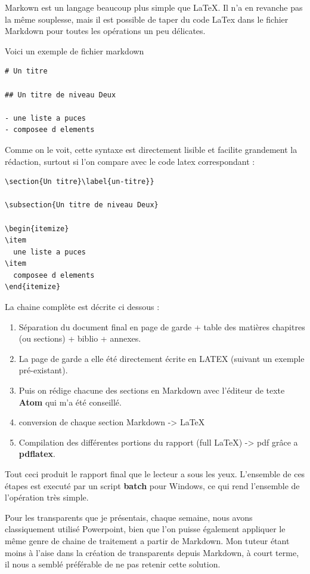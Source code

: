 Markown est un langage beaucoup plus simple que LaTeX. Il n'a en
revanche pas la même souplesse, mais il est possible de taper du code
LaTex dans le fichier Markdown pour toutes les opérations un peu
délicates.

Voici un exemple de fichier markdown

\begin{lstlisting}
# Un titre

## Un titre de niveau Deux

- une liste a puces
- composee d elements
\end{lstlisting}

Comme on le voit, cette syntaxe est directement lisible et facilite
grandement la rédaction, surtout si l'on compare avec le code latex
correspondant :

\begin{lstlisting}
\section{Un titre}\label{un-titre}}

\subsection{Un titre de niveau Deux}

\begin{itemize}
\item
  une liste a puces
\item
  composee d elements
\end{itemize}
\end{lstlisting}

La chaine complète est décrite ci dessous :

\begin{enumerate}
\def\labelenumi{\arabic{enumi}.}
\tightlist
\item
  Séparation du document final en page de garde + table des matières
  chapitres (ou sections) + biblio + annexes.\\
\item
  La page de garde a elle été directement écrite en LATEX (suivant un
  exemple pré-existant).
\item
  Puis on rédige chacune des sections en Markdown avec l'éditeur de
  texte \textbf{Atom} qui m'a été conseillé.
\item
  conversion de chaque section Markdown -\textgreater{} LaTeX
\item
  Compilation des différentes portions du rapport (full LaTeX)
  -\textgreater{} pdf grâce a \textbf{pdflatex}.
\end{enumerate}

Tout ceci produit le rapport final que le lecteur a sous les yeux.
L'ensemble de ces étapes est executé par un script \textbf{batch} pour
Windows, ce qui rend l'ensemble de l'opération très simple.

Pour les transparents que je présentais, chaque semaine, nous avons
classiquement utilisé Powerpoint, bien que l'on puisse également
appliquer le même genre de chaine de traitement a partir de Markdown.
Mon tuteur étant moins à l'aise dans la création de transparents depuis
Markdown, à court terme, il nous a semblé préférable de ne pas retenir
cette solution.
